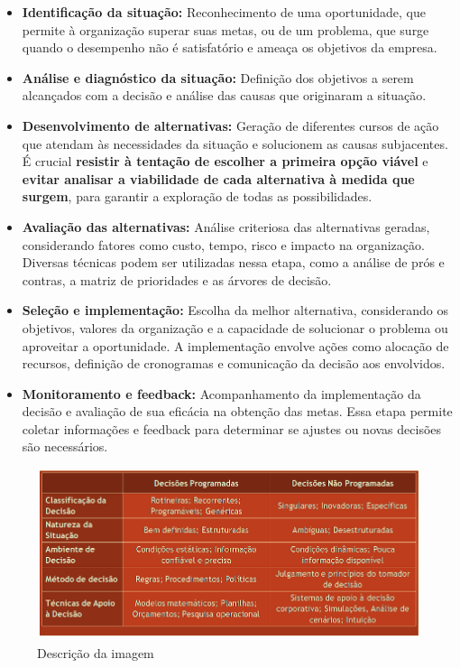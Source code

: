 \begin{itemize}
    \item \textbf{Identificação da situação:} Reconhecimento de uma oportunidade, que permite à organização superar suas metas, ou de um problema, que surge quando o desempenho não é satisfatório e ameaça os objetivos da empresa.
    \item \textbf{Análise e diagnóstico da situação:} Definição dos objetivos a serem alcançados com a decisão e análise das causas que originaram a situação.
    \item \textbf{Desenvolvimento de alternativas:} Geração de diferentes cursos de ação que atendam às necessidades da situação e solucionem as causas subjacentes. É crucial \textbf{resistir à tentação de escolher a primeira opção viável} e \textbf{evitar analisar a viabilidade de cada alternativa à medida que surgem}, para garantir a exploração de todas as possibilidades.
    \item \textbf{Avaliação das alternativas:} Análise criteriosa das alternativas geradas, considerando fatores como custo, tempo, risco e impacto na organização. Diversas técnicas podem ser utilizadas nessa etapa, como a análise de prós e contras, a matriz de prioridades e as árvores de decisão.
    \item \textbf{Seleção e implementação:} Escolha da melhor alternativa, considerando os objetivos, valores da organização e a capacidade de solucionar o problema ou aproveitar a oportunidade. A implementação envolve ações como alocação de recursos, definição de cronogramas e comunicação da decisão aos envolvidos.
    \item \textbf{Monitoramento e feedback:} Acompanhamento da implementação da decisão e avaliação de sua eficácia na obtenção das metas. Essa etapa permite coletar informações e feedback para determinar se ajustes ou novas decisões são necessários.
\end{itemize}

\begin{figure}[H]  %
    \centering
    \begin{minipage}{0.6\textwidth}
        \centering
        \includegraphics[width=\textwidth]{img/imagem6.png}
        \caption{Descrição da imagem}
        \label{fig:exemplo}
    \end{minipage}
\end{figure}


